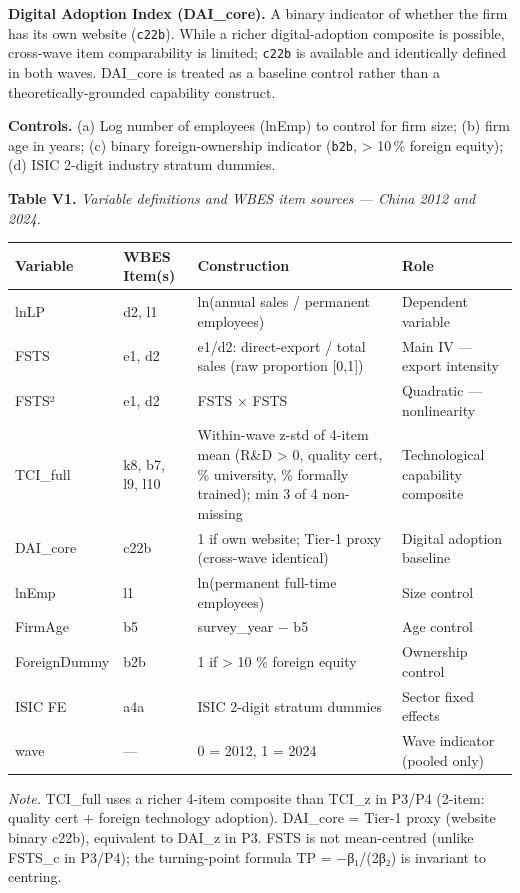 \documentclass[12pt,a4paper]{article}
\begin{document}
\textbf{Digital Adoption Index (DAI\_core).} A binary indicator of
whether the firm has its own website (\texttt{c22b}). While a richer
digital-adoption composite is possible, cross-wave item comparability is
limited; \texttt{c22b} is available and identically defined in both
waves. DAI\_core is treated as a baseline control rather than a
theoretically-grounded capability construct.

\textbf{Controls.} (a) Log number of employees (lnEmp) to control for
firm size; (b) firm age in years; (c) binary foreign-ownership indicator
(\texttt{b2b}, \textgreater{} 10\,\% foreign equity); (d) ISIC 2-digit
industry stratum dummies.

\textbf{Table V1.} \emph{Variable definitions and WBES item sources ---
China 2012 and 2024.}

\begin{longtable}[]{@{}llll@{}}
\toprule\noalign{}
Variable & WBES Item(s) & Construction & Role \\
\midrule\noalign{}
\endhead
\bottomrule\noalign{}
\endlastfoot
lnLP & d2, l1 & ln(annual sales / permanent employees) & Dependent
variable \\
FSTS & e1, d2 & e1/d2: direct-export / total sales (raw proportion
{[}0,1{]}) & Main IV --- export intensity \\
FSTS² & e1, d2 & FSTS × FSTS & Quadratic --- nonlinearity \\
TCI\_full & k8, b7, l9, l10 & Within-wave z-std of 4-item mean (R\&D
\textgreater{} 0, quality cert, \% university, \% formally trained); min
3 of 4 non-missing & Technological capability composite \\
DAI\_core & c22b & 1 if own website; Tier-1 proxy (cross-wave identical)
& Digital adoption baseline \\
lnEmp & l1 & ln(permanent full-time employees) & Size control \\
FirmAge & b5 & survey\_year − b5 & Age control \\
ForeignDummy & b2b & 1 if \textgreater{} 10 \% foreign equity &
Ownership control \\
ISIC FE & a4a & ISIC 2-digit stratum dummies & Sector fixed effects \\
wave & --- & 0 = 2012, 1 = 2024 & Wave indicator (pooled only) \\
\end{longtable}

\emph{Note.} TCI\_full uses a richer 4-item composite than TCI\_z in
P3/P4 (2-item: quality cert + foreign technology adoption). DAI\_core =
Tier-1 proxy (website binary c22b), equivalent to DAI\_z in P3. FSTS is
not mean-centred (unlike FSTS\_c in P3/P4); the turning-point formula TP
= −β₁/(2β₂) is invariant to centring.
\end{document}
